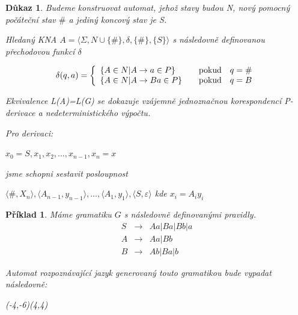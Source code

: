 \documentclass[10pt, a4paper, titlepage]{article}
\theoremstyle{note}
\newtheorem{dukaz}{Důkaz}
\newtheorem{priklad}{Příklad}
\begin{document}
\begin{dukaz}
Budeme konstruovat automat, jehož stavy budou \textit{N}, nový pomocný počáteční stav $ \# $ a jediný koncový stav je \textit{S}.

Hledaný KNA $ A = \langle \Sigma,N \cup \lbrace \# \rbrace,\delta,\lbrace \# \rbrace,\lbrace S \rbrace \rangle$ s následovně definovanou přechodovou funkcí $\delta$

$$
\delta(q,a)=\left\{
\begin{array}{l@{\quad\mbox{}\quad}l}
\lbrace A \in N | A \rightarrow a \in P \rbrace & \text{pokud}\quad q=\#\\
\lbrace A \in N | A \rightarrow Ba \in P \rbrace & \text{pokud}\quad q=B\\
\end{array}
\right.
$$ 

Ekvivalence \textit{L(A)=L(G)} se dokazuje vzájemně jednoznačnou korespondencí P-derivace a nedeterministického výpočtu.

Pro derivaci:

$ x_0=S,x_1,x_2,\ldots,x_{n-1},x_n=x $

jsme schopni sestavit posloupnost

$ \langle \# , X_n \rangle,\langle A_{n-1} , y_{n-1} \rangle,\ldots,\langle A_1 , y_1 \rangle,\langle S , \varepsilon \rangle $ kde $x_i=A_{i}y_{i}$
\end{dukaz}

\begin{priklad}
Máme gramatiku $G$ s následovně definovanými pravidly.
\begin{eqnarray*}
S &\rightarrow& Aa|Ba|Bb|a \\
A &\rightarrow& Aa|Bb \\
B &\rightarrow& Ab|Ba|b
\end{eqnarray*}

Automat rozpoznávající jazyk generovaný touto gramatikou bude vypadat následovně:

\begin{center}
\begin{VCPicture}{(-4,-6)(4,4)}
\end{VCPicture}
\end{center}

\end{priklad}
\end{document}

